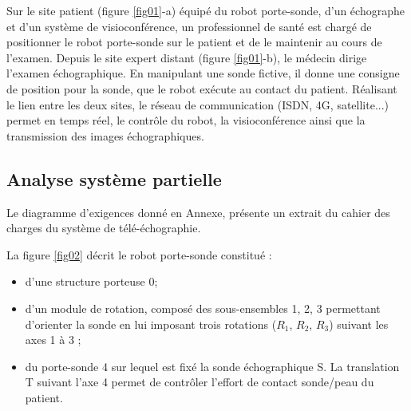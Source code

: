 Sur le site patient (figure \ref{fig01}-a) équipé du robot porte-sonde, d'un échographe et d'un système de visioconférence, un professionnel de santé est chargé de positionner le robot porte-sonde sur le patient et de le maintenir au cours de l'examen. Depuis le site expert distant (figure \ref{fig01}-b), le médecin dirige l'examen échographique. En manipulant une sonde fictive, il donne une consigne de position pour la sonde, que le robot exécute au contact du patient. Réalisant le lien entre les deux sites, le réseau de communication (ISDN, 4G, satellite...) permet en temps réel, le contrôle du robot, la visioconférence ainsi que la transmission des images échographiques. 

\subsection{Analyse système partielle}

Le diagramme d'exigences donné en Annexe, présente un extrait du cahier des charges du système de télé-échographie. 

La figure \ref{fig02} décrit le robot porte-sonde constitué :
\begin{itemize}
 \item d'une structure porteuse 0;
 \item d'un module de rotation, composé des sous-ensembles 1, 2, 3 permettant d'orienter la sonde en lui imposant trois rotations ($R_1$, $R_2$, $R_3$) suivant les axes 1 à 3 ;
 \item du porte-sonde 4 sur lequel est fixé la sonde échographique S. La translation T suivant l'axe 4 permet de contrôler l'effort de contact sonde/peau du patient.
\end{itemize}

